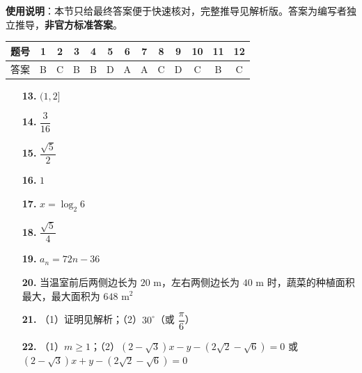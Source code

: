 
\begin{gknotice}
\textbf{使用说明}：本节只给最终答案便于快速核对，完整推导见解析版。答案为编写者独立推导，\textbf{非官方标准答案}。
\end{gknotice}

\begin{center}\begin{tabular}{ccccccccccccc}
\toprule
题号 & 1 & 2 & 3 & 4 & 5 & 6 & 7 & 8 & 9 & 10 & 11 & 12 \\
\midrule
答案 & B & C & B & B & D & A & A & C & D & C & B & C \\
\bottomrule
\end{tabular}\end{center}

\begin{itemize}[leftmargin=2.6em]
  \item[\textbf{13.}] $(1, 2]$
  \item[\textbf{14.}] $\dfrac{3}{16}$
  \item[\textbf{15.}] $\dfrac{\sqrt{5}}{2}$
  \item[\textbf{16.}] $1$
\end{itemize}

\begin{itemize}[leftmargin=2.6em]
  \item[\textbf{17.}] $x=\log_2 6$
  \item[\textbf{18.}] $\dfrac{\sqrt{5}}{4}$
  \item[\textbf{19.}] $a_n=72n-36$
  \item[\textbf{20.}] 当温室前后两侧边长为 $20\text{ m}$，左右两侧边长为 $40\text{ m}$ 时，蔬菜的种植面积最大，最大面积为 $648\text{ m}^2$
  \item[\textbf{21.}] （1）证明见解析；（2）$30^\circ$（或 $\dfrac{\pi}{6}$）
  \item[\textbf{22.}] （1）$m\geqslant 1$；（2）$(2-\sqrt{3})x-y-(2\sqrt{2}-\sqrt{6})=0$ 或 $(2-\sqrt{3})x+y-(2\sqrt{2}-\sqrt{6})=0$
\end{itemize}
